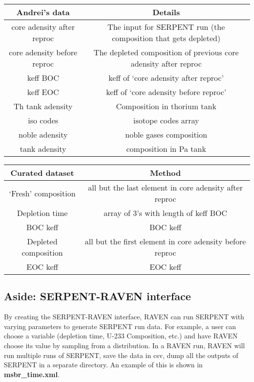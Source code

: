\documentclass{article}
\begin{document}
\begin{table}
\begin{center}
\begin{tabular}{ c c }
    \hline
    Andrei's data & Details \\
    \hline
    core adensity after reproc & The input for SERPENT run (the composition that gets depleted) \\ 
    core adensity before reproc & The depleted composition of previous core adensity after reproc \\
    keff BOC & keff of `core adensity after reproc' \\
    keff EOC & keff of `core adensity before reproc' \\
    Th tank adensity & Composition in thorium tank \\
    iso codes & isotope codes array \\
    noble adensity & noble gases composition \\
    tank adensity & composition in Pa tank \\
    \hline
\end{tabular}
\end{center}
\label{tab:andrei}
\end{table}

\begin{table}

\begin{center}
\begin{tabular}{ c c }
    \hline
    Curated dataset & Method \\
    \hline
    `Fresh' composition & all but the last element in core adensity after reproc  \\
    Depletion time & array of 3's with length of keff BOC \\
    BOC keff & BOC keff \\
    Depleted composition & all but the first element in core adensity before reproc \\  
    EOC keff & EOC keff \\
    \hline
\end{tabular}
\label{tab:csv}
\end{center}
\end{table}


\subsection*{Aside: SERPENT-RAVEN interface}

By creating the SERPENT-RAVEN interface, RAVEN can run SERPENT
with varying parameters to generate SERPENT run data. For example,
a user can choose a variable (depletion time, U-233 Composition, etc.)
and have RAVEN choose its value by sampling from a distribution. 
In a RAVEN run, RAVEN will run multiple runs of SERPENT, save the 
data in csv, dump all the outputs of SERPENT in a separate directory.
An example of this is shown in \textbf{msbr\_time.xml}.
\end{document}
